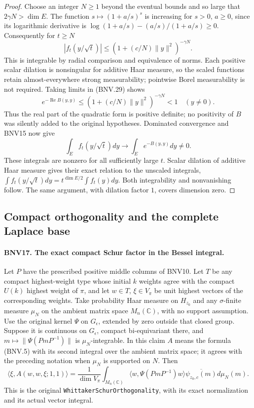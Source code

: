\begin{proof}
Choose an integer $N\ge1$ beyond the eventual bounds and so large that
$2\gamma N>\dim E$.  The function $s\mapsto(1+a/s)^s$ is increasing
for $s>0$, $a\ge0$, since its logarithmic derivative is
$\log(1+a/s)-(a/s)/(1+a/s)\ge0$.
Consequently for $t\ge N$
\[
 |f_t(y/\sqrt t)|\le
       (1+(c/N)\|y\|^2)^{-\gamma N}.
 \tag{BNV.29}
\]
This is integrable by radial comparison and equivalence of norms.
Each positive scalar dilation is nonsingular for additive Haar measure,
so the scaled functions retain almost-everywhere strong measurability;
pointwise Borel measurability is not required.
Taking limits in (BNV.29) shows
\[
 e^{-\operatorname{Re}B(y,y)}
 \le(1+(c/N)\|y\|^2)^{-\gamma N}<1\quad(y\ne0).
\]
Thus the real part of the quadratic form is positive definite; no
positivity of $B$ was silently added to the original hypotheses.
Dominated convergence and BNV15 now give
\[
 \int_E f_t(y/\sqrt t)dy
   \longrightarrow \int_E e^{-B(y,y)}dy\ne0.
\]
These integrals are nonzero for all sufficiently large $t$.  Scalar
dilation of additive Haar measure gives their exact relation to the
unscaled integrals,
$\int f_t(y/\sqrt t)dy=t^{\dim E/2}\int f_t(y)dy$.
Both integrability and nonvanishing follow.  The same argument, with
dilation factor $1$, covers dimension zero.
\end{proof}

\subsection{Compact orthogonality and the complete Laplace base}

\paragraph{BNV17. The exact compact Schur factor in the Bessel integral.}
\label{claim:BNV17}
Let $P$ have the prescribed positive middle columns of BNV10.
Let $T$ be any compact highest-weight type whose initial $k$ weights
agree with the compact $U(k)$ highest weight of $\pi$, and let $w\in T$,
$\xi\in V_\pi$ be unit highest vectors of the corresponding weights.
Take probability Haar measure on $H_{z_0}$ and any $\sigma$-finite
measure $\mu_N$ on the ambient matrix space $M_n(\mathbb C)$, with
no support assumption.  Use the original kernel $\Psi$ on $G_\epsilon$,
extended by zero outside that closed group.  Suppose it is continuous
on $G_\epsilon$, compact bi-equivariant there, and
$m\mapsto\|\Psi(PmP^{-1})\|$ is $\mu_N$-integrable.  In this claim
$A$ means the formula (BNV.5) with its second integral over the ambient
matrix space; it agrees with the preceding notation when $\mu_N$ is
supported on $N$.  Then
\[
 \langle\xi,A(w,w,\xi;1,1)\rangle
 =\frac1{\dim V_\pi}
       \int_{M_n(\mathbb C)}\langle w,\Psi(PmP^{-1})w\rangle
                     \overline{\psi_{z_0,c}(m)}d\mu_N(m).
 \tag{BNV.30}
\]
This is the original \texttt{WhittakerSchurOrthogonality}, with its exact
normalization and its actual vector integral.

